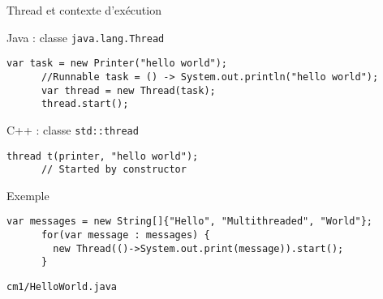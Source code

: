 
\begingroup

\begin{frame}[fragile]{Thread et contexte d'exécution}

  \begin{block}{Java : classe \lstinline{java.lang.Thread}}
    \begin{lstlisting}[gobble=6]
      var task = new Printer("hello world");
      //Runnable task = () -> System.out.println("hello world");
      var thread = new Thread(task);
      thread.start();
    \end{lstlisting}
  \end{block}

  \begin{block}{C++ : classe \lstinline{std::thread}}
    \begin{lstlisting}[gobble=6]
      thread t(printer, "hello world");
      // Started by constructor
    \end{lstlisting}
  \end{block}

  \begin{exampleblock}{Exemple}
    \begin{lstlisting}[gobble=6]
      var messages = new String[]{"Hello", "Multithreaded", "World"};
      for(var message : messages) {
        new Thread(()->System.out.print(message)).start();
      }
    \end{lstlisting}
  \end{exampleblock}

  \begin{citing}
    \jitem \lstinline{cm1/HelloWorld.java}
  \end{citing}

\end{frame}

\endgroup
\endinput
